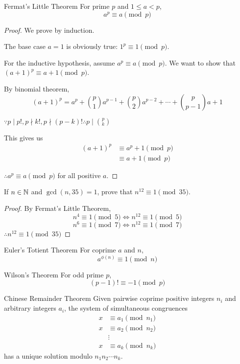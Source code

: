 \begin{thrm}{Fermat's Little Theorem}{}
For prime $p$ and $1 \le a < p$,
\begin{equation}
a^p \equiv a \pmod p 
\end{equation} 
\end{thrm}
\begin{proof}
We prove by induction.

The base case $a=1$ is obviously true: $1^p \equiv 1 \pmod p$.

For the inductive hypothesis, assume $a^p \equiv a \pmod p$. We want to show that $(a+1)^p \equiv a+1 \pmod p$.

By binomial theorem, 
\[ (a+1)^p = a^p + \binom{p}{1}a^{p-1} + \binom{p}{2}a^{p-2} + \cdots + \binom{p}{p-1}a + 1 \]

$\because p \mid p!, p \nmid k!, p \nmid (p-k)! \therefore p \mid \binom{p}{k}$

This gives us 
\begin{align*}
(a+1)^p &\equiv a^p+1 \pmod p \\
&\equiv a+1 \pmod p
\end{align*}

$\therefore a^p \equiv a \pmod p$ for all positive $a$.
\end{proof}

\begin{exmp}{}{}
If $n\in\mathbb N$ and $\gcd(n,35)=1$, prove that $n^{12} \equiv 1 \pmod 35$.
\end{exmp}
\begin{proof}
By Fermat's Little Theorem,
\[ n^4 \equiv 1 \pmod 5 \iff n^{12} \equiv 1 \pmod 5 \]
\[ n^6 \equiv 1 \pmod 7 \iff n^{12} \equiv 1 \pmod 7 \]
$\therefore n^{12} \equiv 1 \pmod 35$
\end{proof}

\begin{thrm}{Euler's Totient Theorem}{}
For coprime $a$ and $n$, 
\begin{equation} a^{\phi(n)} \equiv 1 \pmod n \end{equation}
\end{thrm} 

\begin{thrm}{Wilson's Theorem}{} 
For odd prime $p$, 
\begin{equation} (p-1)! \equiv -1 \pmod p \end{equation}
\end{thrm}

\begin{thrm}{Chinese Remainder Theorem}{}
Given pairwise coprime positive integers $n_i$ and arbitrary integers $a_i$, the system of simultaneous congruences 
\begin{align*} 
x &\equiv a_1 \pmod {n_1} \\ 
x &\equiv a_2 \pmod {n_2} \\ 
&\vdots \\ 
x &\equiv a_k \pmod {n_k} 
\end{align*} 
has a unique solution modulo $n_1 n_2 \cdots n_k$.
\end{thrm}

